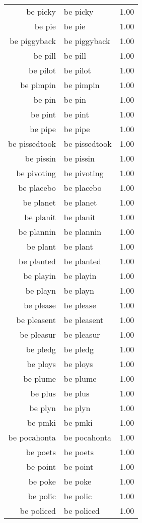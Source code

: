 \begin{table}[ht]
\begin{tabular}{rlr}
  be picky & be picky & 1.00 \\ 
  be pie & be pie & 1.00 \\ 
  be piggyback & be piggyback & 1.00 \\ 
  be pill & be pill & 1.00 \\ 
  be pilot & be pilot & 1.00 \\ 
  be pimpin & be pimpin & 1.00 \\ 
  be pin & be pin & 1.00 \\ 
  be pint & be pint & 1.00 \\ 
  be pipe & be pipe & 1.00 \\ 
  be pissedtook & be pissedtook & 1.00 \\ 
  be pissin & be pissin & 1.00 \\ 
  be pivoting & be pivoting & 1.00 \\ 
  be placebo & be placebo & 1.00 \\ 
  be planet & be planet & 1.00 \\ 
  be planit & be planit & 1.00 \\ 
  be plannin & be plannin & 1.00 \\ 
  be plant & be plant & 1.00 \\ 
  be planted & be planted & 1.00 \\ 
  be playin & be playin & 1.00 \\ 
  be playn & be playn & 1.00 \\ 
  be please & be please & 1.00 \\ 
  be pleasent & be pleasent & 1.00 \\ 
  be pleasur & be pleasur & 1.00 \\ 
  be pledg & be pledg & 1.00 \\ 
  be ploys & be ploys & 1.00 \\ 
  be plume & be plume & 1.00 \\ 
  be plus & be plus & 1.00 \\ 
  be plyn & be plyn & 1.00 \\ 
  be pmki & be pmki & 1.00 \\ 
  be pocahonta & be pocahonta & 1.00 \\ 
  be poets & be poets & 1.00 \\ 
  be point & be point & 1.00 \\ 
  be poke & be poke & 1.00 \\ 
  be polic & be polic & 1.00 \\ 
  be policed & be policed & 1.00 \\ 

\end{tabular}
\end{table}
